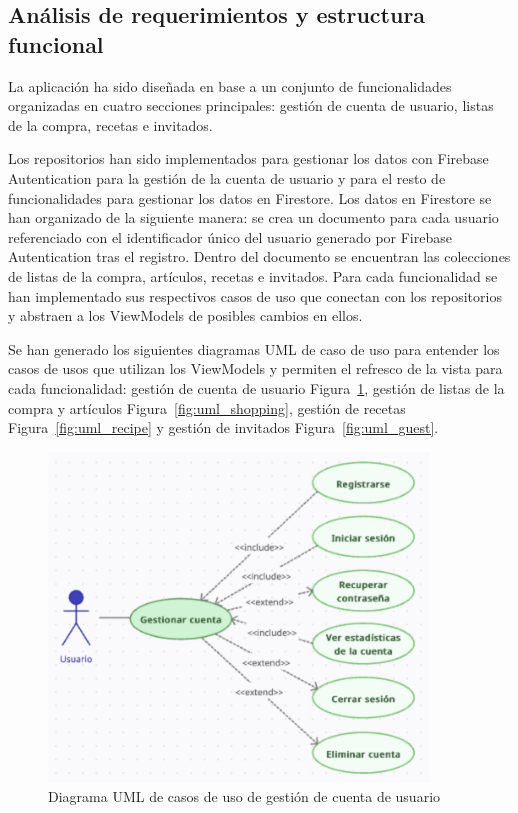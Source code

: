 \subsection{Análisis de requerimientos y estructura funcional}

La aplicación ha sido diseñada en base a un conjunto de funcionalidades organizadas en cuatro secciones principales: gestión de cuenta de usuario, listas de la compra, recetas e invitados.

Los repositorios han sido implementados para gestionar los datos con Firebase Autentication para la gestión de la cuenta de usuario y para el resto de funcionalidades para gestionar los datos en Firestore. Los datos en Firestore se han organizado de la siguiente manera: se crea un documento para cada usuario referenciado con el identificador único del usuario generado por Firebase Autentication tras el registro. Dentro del documento se encuentran las colecciones de listas de la compra, artículos, recetas e invitados. Para cada funcionalidad se han implementado sus respectivos casos de uso que conectan con los repositorios y abstraen a los ViewModels de posibles cambios en ellos.

Se han generado los siguientes diagramas UML de caso de uso para entender los casos de usos que utilizan los ViewModels y permiten el refresco de la vista para cada funcionalidad: gestión de cuenta de usuario Figura~\ref{fig:uml_user}, gestión de listas de la compra y artículos Figura~\ref{fig:uml_shopping}, gestión de recetas Figura~\ref{fig:uml_recipe} y gestión de invitados Figura~\ref{fig:uml_guest}.

\begin{figure}[H]
\centering
\includegraphics[width=0.9\textwidth]{./img/description/uml_usuario.png}
\caption{Diagrama UML de casos de uso de gestión de cuenta de usuario}
\label{fig:uml_user}
\end{figure}

